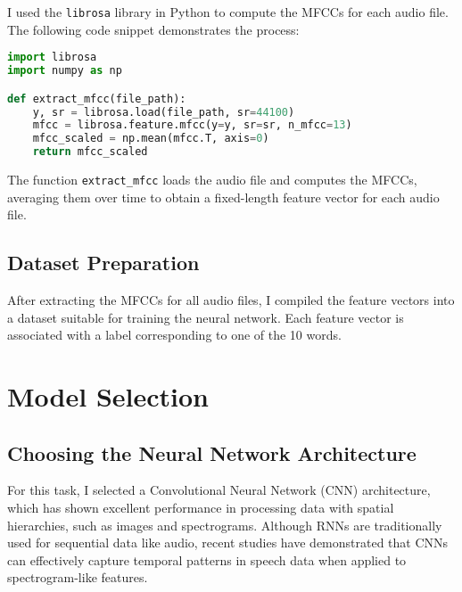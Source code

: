 \documentclass[12pt]{article}
\begin{document}
I used the \texttt{librosa} library in Python to compute the MFCCs for each audio file. The following code snippet demonstrates the process:

\begin{lstlisting}[language=Python, caption=MFCC Feature Extraction]
import librosa
import numpy as np

def extract_mfcc(file_path):
    y, sr = librosa.load(file_path, sr=44100)
    mfcc = librosa.feature.mfcc(y=y, sr=sr, n_mfcc=13)
    mfcc_scaled = np.mean(mfcc.T, axis=0)
    return mfcc_scaled
\end{lstlisting}

The function \texttt{extract\_mfcc} loads the audio file and computes the MFCCs, averaging them over time to obtain a fixed-length feature vector for each audio file.

\subsection{Dataset Preparation}

After extracting the MFCCs for all audio files, I compiled the feature vectors into a dataset suitable for training the neural network. Each feature vector is associated with a label corresponding to one of the 10 words.

\newpage




\section{Model Selection}

\subsection{Choosing the Neural Network Architecture}

For this task, I selected a Convolutional Neural Network (CNN) architecture, which has shown excellent performance in processing data with spatial hierarchies, such as images and spectrograms. Although RNNs are traditionally used for sequential data like audio, recent studies have demonstrated that CNNs can effectively capture temporal patterns in speech data when applied to spectrogram-like features.
\end{document}
